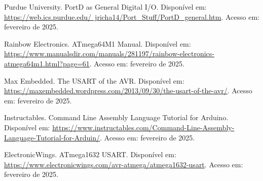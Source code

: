 \documentclass{sbrt}
\begin{document}
\begin{thebibliography}{5}

 Purdue University. PortD as General Digital I/O. Disponível em: 
\href{https://web.ics.purdue.edu/~jricha14/Port_Stuff/PortD_general.htm}{https://web.ics.purdue.edu/~jricha14/Port_Stuff/PortD_general.htm}. 
Acesso em: fevereiro de 2025.

 Rainbow Electronics. ATmega64M1 Manual. Disponível em: 
\href{https://www.manualsdir.com/manuals/281197/rainbow-electronics-atmega64m1.html?page=61}{https://www.manualsdir.com/manuals/281197/rainbow-electronics-atmega64m1.html?page=61}. 
Acesso em: fevereiro de 2025.

 Max Embedded. The USART of the AVR. Disponível em: 
\href{https://maxembedded.wordpress.com/2013/09/30/the-usart-of-the-avr/}{https://maxembedded.wordpress.com/2013/09/30/the-usart-of-the-avr/}. 
Acesso em: fevereiro de 2025.

 Instructables. Command Line Assembly Language Tutorial for Arduino. Disponível em: 
\href{https://www.instructables.com/Command-Line-Assembly-Language-Tutorial-for-Arduin/}{https://www.instructables.com/Command-Line-Assembly-Language-Tutorial-for-Arduin/}. 
Acesso em: fevereiro de 2025.

 ElectronicWings. ATmega1632 USART. Disponível em: 
\href{https://www.electronicwings.com/avr-atmega/atmega1632-usart}{https://www.electronicwings.com/avr-atmega/atmega1632-usart}. 
Acesso em: fevereiro de 2025.

\end{thebibliography}
\end{document}

